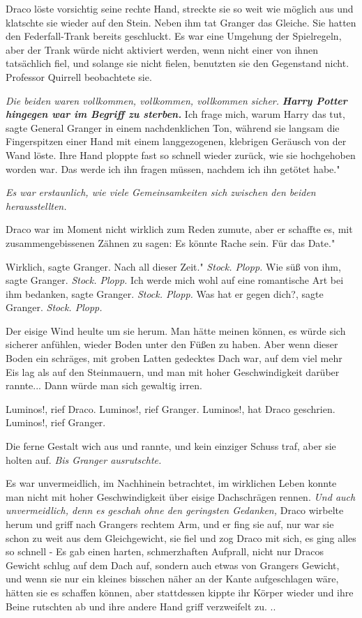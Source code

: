 Draco löste vorsichtig seine rechte Hand, streckte sie so weit wie möglich aus
und klatschte sie wieder auf den Stein. Neben ihm tat Granger das Gleiche. Sie
hatten den Federfall-Trank bereits geschluckt. Es war eine Umgehung der
Spielregeln, aber der Trank würde nicht aktiviert werden, wenn nicht einer von
ihnen tatsächlich fiel, und solange sie nicht fielen, benutzten sie den
Gegenstand nicht. Professor Quirrell beobachtete sie.

\emph{Die beiden waren vollkommen, vollkommen, vollkommen sicher.}
\textbf{\emph{Harry Potter hingegen war im Begriff zu sterben.}}\textbf{ } \glqq
Ich frage mich, warum Harry das tut\grqq{}, sagte General Granger in einem
nachdenklichen Ton, während sie langsam die Fingerspitzen einer Hand mit einem
langgezogenen, klebrigen Geräusch von der Wand löste. Ihre Hand ploppte fast so
schnell wieder zurück, wie sie hochgehoben worden war. \glqq Das werde ich ihn
fragen müssen, nachdem ich ihn getötet habe."

\emph{ Es war erstaunlich, wie viele Gemeinsamkeiten sich zwischen den beiden herausstellten.}

Draco war im Moment nicht wirklich zum Reden zumute, aber er schaffte es, mit
zusammengebissenen Zähnen zu sagen: \glqq Es könnte Rache sein. Für das Date."

\glqq Wirklich\grqq{}, sagte Granger. \glqq Nach all dieser Zeit."
\emph{ Stock. Plopp.}
\glqq Wie süß von ihm\grqq{}, sagte Granger.
\emph{ Stock. Plopp.}
\glqq Ich werde mich wohl auf eine romantische Art bei ihm bedanken\grqq{},
sagte Granger.
\emph{Stock. Plopp.}
\glqq Was hat er gegen dich?\grqq{}, sagte Granger.
\emph{Stock. Plopp.}

Der eisige Wind heulte um sie herum. Man hätte meinen können, es würde sich
sicherer anfühlen, wieder Boden unter den Füßen zu haben. Aber wenn dieser Boden
ein schräges, mit groben Latten gedecktes Dach war, auf dem viel mehr Eis lag
als auf den Steinmauern, und man mit hoher Geschwindigkeit darüber rannte...
Dann würde man sich gewaltig irren.

\glqq Luminos!\grqq{}, rief Draco. \glqq Luminos!\grqq{}, rief Granger. \glqq
Luminos!\grqq{}, hat Draco geschrien. \glqq Luminos!\grqq{}, rief Granger.

Die ferne Gestalt wich aus und rannte, und kein einziger Schuss traf, aber sie
holten auf. \emph{ Bis Granger ausrutschte.}

Es war unvermeidlich, im Nachhinein betrachtet, im wirklichen Leben konnte man
nicht mit hoher Geschwindigkeit über eisige Dachschrägen rennen.
\emph{ Und auch unvermeidlich, denn es geschah ohne den geringsten Gedanken,}
Draco wirbelte herum und griff nach Grangers rechtem Arm, und er fing sie auf,
nur war sie schon zu weit aus dem Gleichgewicht, sie fiel und zog Draco mit
sich, es ging alles so schnell - Es gab einen harten, schmerzhaften Aufprall,
nicht nur Dracos Gewicht schlug auf dem Dach auf, sondern auch etwas von
Grangers Gewicht, und wenn sie nur ein kleines bisschen näher an der Kante
aufgeschlagen wäre, hätten sie es schaffen können, aber stattdessen kippte ihr
Körper wieder und ihre Beine rutschten ab und ihre andere Hand griff verzweifelt
zu. ..

